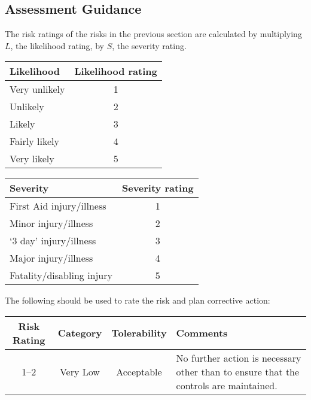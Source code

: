 \begin{landscape}

\section{Assessment Guidance}

The risk ratings of the risks in the previous section are calculated by multiplying $L$, the likelihood rating, by $S$, the severity rating.

\bigskip
\begin{minipage}[b]{0.5\linewidth}
\begin{tabular}[c]{lc}
\hline
  \textbf{Likelihood} & \textbf{Likelihood rating} \\
\hline
  Very unlikely & 1 \\
  Unlikely & 2 \\
  Likely & 3 \\
  Fairly likely & 4 \\
  Very likely & 5 \\
\hline
\end{tabular}
\end{minipage}
\begin{minipage}[b]{0.5\linewidth}
\begin{tabular}[c]{lc}
\hline
  \textbf{Severity} & \textbf{Severity rating} \\
\hline
  First Aid injury/illness & 1 \\
  Minor injury/illness & 2 \\
  `3 day' injury/illness & 3 \\
  Major injury/illness & 4 \\
  Fatality/disabling injury & 5 \\
\hline
\end{tabular}
\end{minipage}
\bigskip

The following should be used to rate the risk and plan corrective action:
\bigskip
\newcommand{\riskinfo}[4]{
  #1 & #2 & #3 & #4 \\
}

\begin{tabular*}{\linewidth}[c]{cccp{33em}}
\hline
  \textbf{Risk Rating} & \textbf{Category} & \textbf{Tolerability} & \textbf{Comments} \\
\hline

  \riskinfo{1--2}{Very Low}{Acceptable}
  {No further action is necessary other than to ensure that the controls are maintained.}


\end{tabular*}
\end{landscape}
